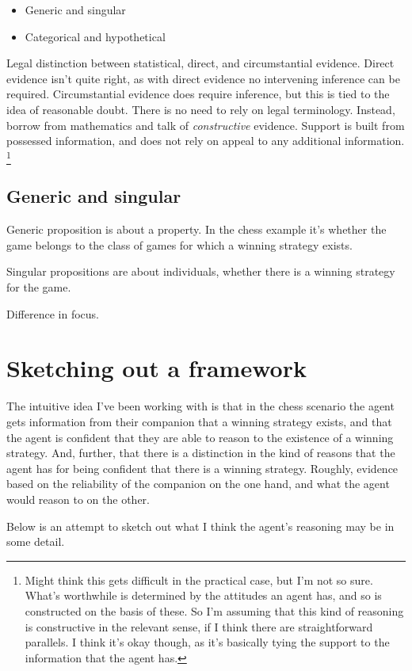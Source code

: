 \documentclass[10pt]{article}
\begin{document}
\begin{itemize}
\item Generic and singular
\item Categorical and hypothetical
\end{itemize}


Legal distinction between statistical, direct, and circumstantial evidence.
Direct evidence isn't quite right, as with direct evidence no intervening inference can be required.
Circumstantial evidence does require inference, but this is tied to the idea of reasonable doubt.
There is no need to rely on legal terminology.
Instead, borrow from mathematics and talk of \emph{constructive} evidence.
Support is built from possessed information, and does not rely on appeal to any additional information.\nolinebreak
\footnote{
  Might think this gets difficult in the practical case, but I'm not so sure.
  What's worthwhile is determined by the attitudes an agent has, and so is constructed on the basis of these.
  So I'm assuming that this kind of reasoning is constructive in the relevant sense, if I think there are straightforward parallels.
  I think it's okay though, as it's basically tying the support to the information that the agent has.
}

\subsection{Generic and singular}
\label{sec:generic-singular}

Generic proposition is about a property.
In the chess example it's whether the game belongs to the class of games for which a winning strategy exists.

Singular propositions are about individuals, whether there is a winning strategy for the game.

Difference in focus.


\section{Sketching out a framework}
\label{sec:sketch-out-fram}

\begin{note}
  The intuitive idea I've been working with is that in the chess scenario the agent gets information from their companion that a winning strategy exists, and that the agent is confident that they are able to reason to the existence of a winning strategy.
  And, further, that there is a distinction in the kind of reasons that the agent has for being confident that there is a winning strategy.
  Roughly, evidence based on the reliability of the companion on the one hand, and what the agent would reason to on the other.

  Below is an attempt to sketch out what I think the agent's reasoning may be in some detail.
\end{note}
\end{document}
